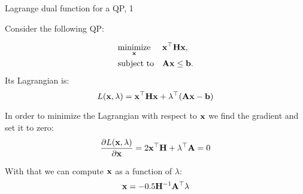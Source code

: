 \documentclass{beamer}
\begin{document}
\begin{frame}{Lagrange dual function for a QP, 1}
	\begin{flushleft}
		
		Consider the following QP:
		
		\begin{equation}
			\begin{aligned}
				& \underset{\mathbf{x}}{\text{minimize}}
				& & \mathbf{x}^\top \mathbf{H} \mathbf{x}, \\
				& \text{subject to}
				& & \mathbf{A}\mathbf{x} \leq \mathbf{b}.
			\end{aligned}
		\end{equation}
		Its Lagrangian is:
		\begin{equation}
			L(\mathbf{x}, \lambda) = \mathbf{x}^\top \mathbf{H} \mathbf{x} + \lambda^\top (\mathbf{A}\mathbf{x} - \mathbf{b})
		\end{equation}
		
		In order to minimize the Lagrangian with respect to $\mathbf{x}$ we find the gradient and set it to zero:
		\begin{equation}
			\frac{\partial L(\mathbf{x}, \lambda)}{\partial \mathbf{x}} = 2\mathbf{x}^\top \mathbf{H} + \lambda^\top \mathbf{A} = 0
		\end{equation}
		
		With that we can compute $\mathbf{x}$ as a function of $\lambda$:
		\begin{equation}
			\mathbf{x} = -0.5\mathbf{H}^{-1}\mathbf{A}^\top \lambda
		\end{equation}
		
	\end{flushleft}
\end{frame}
\end{document}
